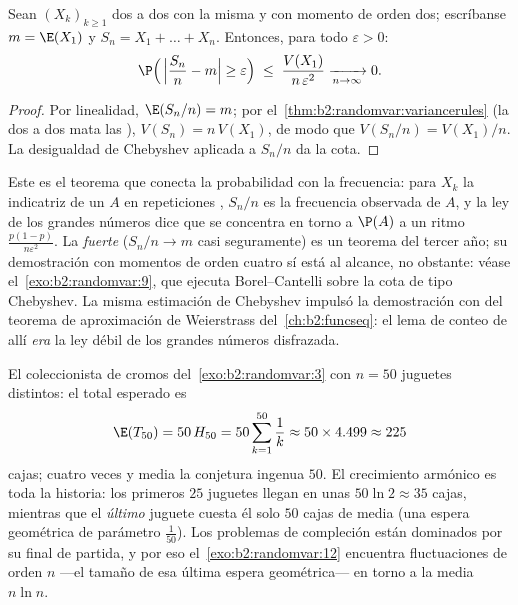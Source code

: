 \begin{theorem}\label{thm:b2:randomvar:lln}
Sean $(X_k)_{k \geq 1}$   dos a dos
con la misma  y con momento de orden dos; escríbanse $m =
\E(X_1)$ y $S_n = X_1 + \dots + X_n$. Entonces, para todo
$\varepsilon > 0$:
\[
\P\Bigl(\,\Bigl|\frac{S_n}{n} - m\Bigr| \geq \varepsilon\Bigr)
\;\leq\; \frac{V(X_1)}{n\,\varepsilon^2}
\xrightarrow[n \to \infty]{} 0 .
\]
\end{theorem}

\begin{proof}
Por linealidad, $\E(S_n/n) = m$; por el~\cref{thm:b2:randomvar:variancerules} (la  dos a dos mata
las ), $V(S_n) = n\,V(X_1)$, de modo que $V(S_n/n) =
V(X_1)/n$. La desigualdad de Chebyshev aplicada a $S_n/n$ da la
cota.
\end{proof}

\begin{remark}
Este es el teorema que conecta la probabilidad con la frecuencia:
para $X_k$ la indicatriz de un  $A$ en repeticiones
, $S_n/n$ es la frecuencia observada de $A$, y la ley de
los grandes números dice que se concentra en torno a $\P(A)$ a un
ritmo $\frac{p(1-p)}{n\varepsilon^2}$. La  \emph{fuerte} ($S_n/n
\to m$ casi seguramente) es un teorema del tercer año; su
demostración con momentos de orden cuatro sí está al alcance, no
obstante: véase el~\cref{exo:b2:randomvar:9}, que ejecuta
Borel--Cantelli sobre la cota de tipo Chebyshev. La misma estimación
de Chebyshev impulsó la demostración con  del
teorema de aproximación de Weierstrass del~\cref{ch:b2:funcseq}: el
lema de conteo de allí \emph{era} la ley débil de los grandes números
disfrazada.
\end{remark}

\begin{example}
\label{ex:b2:randomvar:couponnumeric}
El coleccionista de cromos del~\cref{exo:b2:randomvar:3} con $n = 50$
juguetes distintos: el total esperado es
\[
\E(T_{50}) = 50\,H_{50} = 50\sum_{k=1}^{50}\frac1k
\approx 50 \times 4.499 \approx 225
\]
cajas; cuatro veces y media la conjetura ingenua $50$. El crecimiento
armónico es toda la historia: los primeros $25$ juguetes llegan en
unas $50\ln2 \approx 35$ cajas, mientras que el \emph{último} juguete
cuesta él solo $50$ cajas de media (una espera geométrica de
parámetro $\frac1{50}$). Los problemas de compleción están dominados
por su final de partida, y por eso el~\cref{exo:b2:randomvar:12}
encuentra fluctuaciones de orden $n$ ---el tamaño de esa última
espera geométrica--- en torno a la media $n\ln n$.
\end{example}

